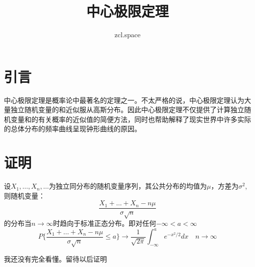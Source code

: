 \documentclass[10pt,a4paper,UTF8]{article}
\author{zcl.space}
\date{}
\title{中心极限定理}
\begin{document}
\maketitle
\tableofcontents
{}

\section{引言}
\label{sec:org5e1ec81}


中心极限定理是概率论中最著名的定理之一。不太严格的说，中心极限定理认为大量独立随机变量的和近似服从高斯分布。因此中心极限定理不仅提供了计算独立随机变量和的有关概率的近似值的简便方法，同时也帮助解释了现实世界中许多实际的总体分布的频率曲线呈现钟形曲线的原因。
\section{证明}
\label{sec:orge7a0ec9}


\begin{tikztheorem}
设\(X_{1},\ldots ,X_{n},\ldots\)为独立同分布的随机变量序列，其公共分布的均值为\(\mu\)，方差为\(\sigma^{2}\),则随机变量：
\begin{equation}
\label{eq:1}
\frac{X_{1} + \ldots + X_{n} - n\mu}{\sigma \sqrt{n}}
\end{equation}
的分布当\(n\to \infty\)时趋向于标准正态分布。即对任何\(-\infty < a < \infty\)
\begin{equation}
\label{eq:2}
P\bigg\{ \frac{X_{1} + \ldots + X_{n} - n\mu}{\sigma\sqrt{n}} \leq a \bigg\} \to \frac{1}{\sqrt{2\pi}}\int_{-\infty}^{a}e^{-x^{2}/2}dx \quad n\to \infty
\end{equation}
\end{tikztheorem}

我还没有完全看懂。留待以后证明
\end{document}
